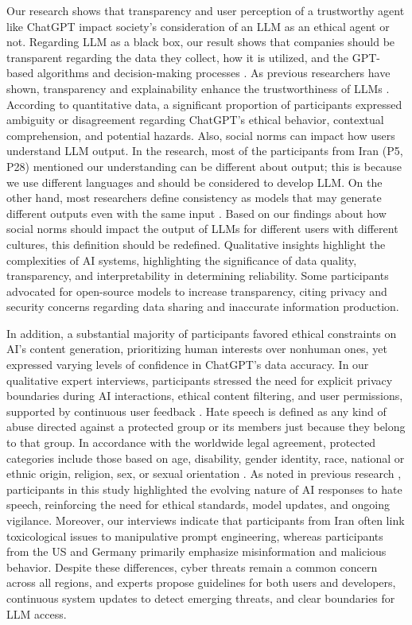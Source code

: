 \documentclass[sigconf]{acmart}
\begin{document}
Our research shows that transparency and user perception of a trustworthy agent like ChatGPT impact society's consideration of an LLM as an ethical agent or not. Regarding LLM as a black box, our result shows that companies should be transparent regarding the data they collect, how it is utilized, and the GPT-based algorithms and decision-making processes \cite{rivas2023marketing}. As previous researchers have shown, transparency and explainability enhance the trustworthiness of LLMs \cite{10.1145/3584931.3607492, barman2024beyond, poslonoutpacing, quttainah2024cost}. According to quantitative data, a significant proportion of participants expressed ambiguity or disagreement regarding ChatGPT's ethical behavior, contextual comprehension, and potential hazards. Also, social norms can impact how users understand LLM output. In the research, most of the participants from Iran (P5, P28) mentioned our understanding can be different about output; this is because we use different languages and should be considered to develop LLM. On the other hand, most researchers define consistency as models that may generate different outputs even with the same input \cite{lee2024one}. Based on our findings about how social norms should impact the output of LLMs for different users with different cultures, this definition should be redefined. Qualitative insights highlight the complexities of AI systems, highlighting the significance of data quality, transparency, and interpretability in determining reliability. Some participants advocated for open-source models to increase transparency, citing privacy and security concerns regarding data sharing and inaccurate information production.

In addition, a substantial majority of participants favored ethical constraints on AI’s content generation, prioritizing human interests over nonhuman ones, yet expressed varying levels of confidence in ChatGPT’s data accuracy. In our qualitative expert interviews, participants stressed the need for explicit privacy boundaries during AI interactions, ethical content filtering, and user permissions, supported by continuous user feedback \cite{derner2023beyond}. Hate speech is defined as any kind of abuse directed against a protected group or its members just because they belong to that group. In accordance with the worldwide legal agreement, protected categories include those based on age, disability, gender identity, race, national or ethnic origin, religion, sex, or sexual orientation \cite{das2023evaluating}. As noted in previous research \cite{das2023evaluating, das-etal-2024-evaluating}, participants in this study highlighted the evolving nature of AI responses to hate speech, reinforcing the need for ethical standards, model updates, and ongoing vigilance. Moreover, our interviews indicate that participants from Iran often link toxicological issues to manipulative prompt engineering, whereas participants from the US and Germany primarily emphasize misinformation and malicious behavior. Despite these differences, cyber threats remain a common concern across all regions, and experts propose guidelines for both users and developers, continuous system updates to detect emerging threats, and clear boundaries for LLM access. 
 
\end{document}
